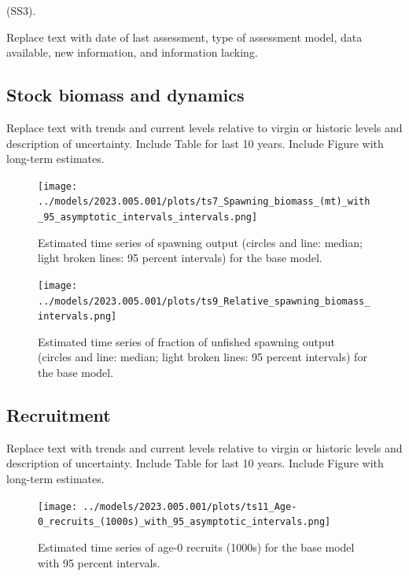 \documentclass[11pt,
  english,
  letterpaper,
]{article}
\begin{document}
(SS3).

Replace text with date of last assessment, type of assessment model, data available, new information, and information lacking.

\hypertarget{stock-biomass-and-dynamics}{%
\subsection*{Stock biomass and dynamics}\label{stock-biomass-and-dynamics}}

Replace text with trends and current levels relative to virgin or historic levels and description of uncertainty. Include Table for last 10 years. Include Figure with long-term estimates.



\begin{figure}
\centering
\texttt{[image: ../models/2023.005.001/plots/ts7\_Spawning\_biomass\_(mt)\_with\_95\_asymptotic\_intervals\_intervals.png]}
\caption{Estimated time series of spawning output (circles and line: median; light broken lines: 95 percent intervals) for the base model.\label{fig:es-ssb}}
\end{figure}

\begin{figure}
\centering
\texttt{[image: ../models/2023.005.001/plots/ts9\_Relative\_spawning\_biomass\_intervals.png]}
\caption{Estimated time series of fraction of unfished spawning output (circles and line: median; light broken lines: 95 percent intervals) for the base model.\label{fig:es-depl}}
\end{figure}

\clearpage

\hypertarget{recruitment}{%
\subsection*{Recruitment}\label{recruitment}}

Replace text with trends and current levels relative to virgin or historic levels and description of uncertainty. Include Table for last 10 years. Include Figure with long-term estimates.



\begin{figure}
\centering
\texttt{[image: ../models/2023.005.001/plots/ts11\_Age-0\_recruits\_(1000s)\_with\_95\_asymptotic\_intervals.png]}
\caption{Estimated time series of age-0 recruits (1000s) for the base model with 95 percent intervals.\label{fig:es-recruits}}
\end{figure}
\end{document}
